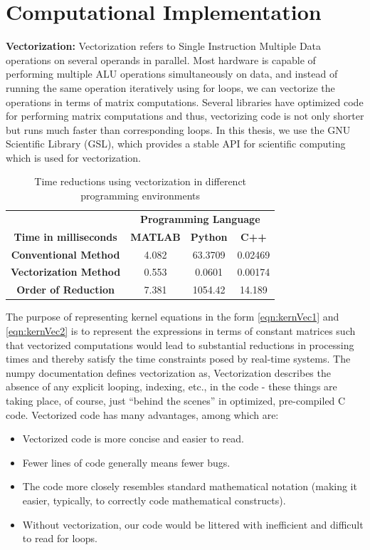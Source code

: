 \documentclass[letterpaper%
, twoside%
, 12pt%
,memoire%
, english%
,creativecommons,hyperref%
]{thETS}
\theoremstyle{newThmStyle}
\begin{document}
\section{Computational Implementation}
\textbf{Vectorization:} Vectorization refers to Single Instruction Multiple Data operations on several operands in parallel. Most hardware is capable of performing multiple ALU operations simultaneously on data, and instead of running the same operation iteratively using for loops, we can vectorize the operations in terms of matrix computations. Several libraries have optimized code for performing matrix computations and thus, vectorizing code is not only shorter but runs much faster than corresponding loops. In this thesis, we use the GNU Scientific Library (GSL), which provides a stable API for scientific computing which is used for vectorization.
\begin{table}
\parbox{0.65\textwidth}{\caption{Time reductions using vectorization in differenct programming environments}\label{Tab:vect}}
\begin{tabular}{|c|c|c|c|}
\hline
         & \multicolumn{3}{c|}{\textbf{Programming Language}}\\\cline{2-4} 
\textbf{Time in milliseconds} &   \textbf{MATLAB}   &  \textbf{Python} &   \textbf{C++} \\ \hline
\textbf{Conventional Method}  & 4.082 & 63.3709 & 0.02469    \\
\textbf{Vectorization Method} & 0.553 & 0.0601  & 0.00174    \\
\textbf{Order of Reduction}   & 7.381 & 1054.42 & 14.189     \\
\hline
\end{tabular}
\end{table}
The purpose of representing kernel equations in the form \eqref{eqn:kernVec1} and \eqref{eqn:kernVec2} is to represent the expressions in terms of constant matrices such that vectorized computations would lead to substantial reductions in processing times and thereby satisfy the time constraints posed by real-time systems. The numpy documentation \citep{oliphant2006guide} defines vectorization as, Vectorization describes the absence of any explicit looping, indexing, etc., in the code - these things are taking place, of course, just “behind the scenes” in optimized, pre-compiled C code. Vectorized code has many advantages, among which are:
\begin{itemize}
\item Vectorized code is more concise and easier to read.
\item Fewer lines of code generally means fewer bugs.
\item The code more closely resembles standard mathematical notation (making it easier, typically, to correctly code mathematical constructs).
\item Without vectorization, our code would be littered with inefficient and difficult to read for loops.
\end{itemize}
\end{document}
